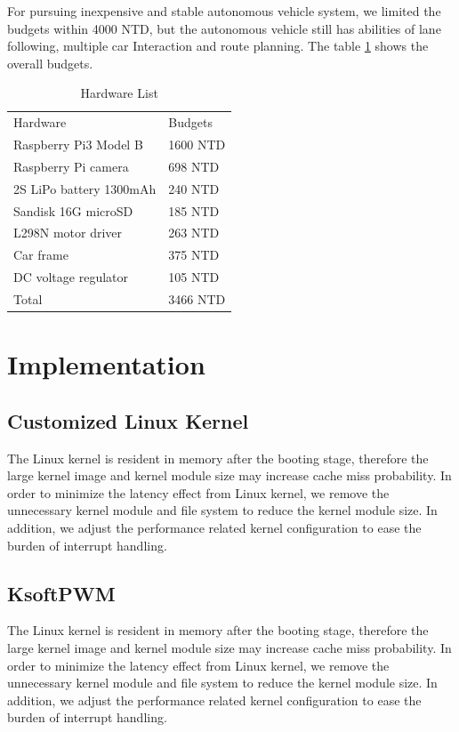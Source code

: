 \documentclass[conference]{IEEEtran}
\begin{document}
For pursuing inexpensive and stable autonomous vehicle system, we limited the budgets within 4000 NTD, but the autonomous vehicle still has abilities of lane following, multiple car Interaction and route planning. The table \ref{hardware_list} shows the overall budgets.

\begin{table}
\centering
\caption{Hardware List}
\label{hardware_list}
\begin{tabular}{ll}
Hardware                & Budgets  \\
Raspberry Pi3 Model B   & 1600 NTD \\
Raspberry Pi camera     & 698 NTD  \\
2S LiPo battery 1300mAh & 240 NTD  \\
Sandisk 16G microSD     & 185 NTD  \\
L298N motor driver      & 263 NTD  \\
Car frame               & 375 NTD  \\
DC voltage regulator    & 105 NTD  \\
Total                   & 3466 NTD
\end{tabular}
\end{table}


\section{Implementation}
\subsection{Customized Linux Kernel}

The Linux kernel is resident in memory after the booting stage, therefore the large kernel image and kernel module size may increase cache miss probability. In order to minimize the latency effect from Linux kernel, we remove the unnecessary kernel module and file system to reduce the kernel module size. In addition, we adjust the performance related kernel configuration to ease the burden of interrupt handling.

\subsection{KsoftPWM}

The Linux kernel is resident in memory after the booting stage, therefore the large kernel image and kernel module size may increase cache miss probability. In order to minimize the latency effect from Linux kernel, we remove the unnecessary kernel module and file system to reduce the kernel module size. In addition, we adjust the performance related kernel configuration to ease the burden of interrupt handling.
\end{document}

